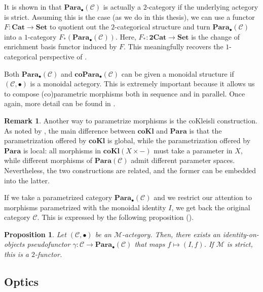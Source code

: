 \documentclass[11pt,a4paper,openright,twoside]{report}
\newcounter{mycounter}
\theoremstyle{plain}
\newtheorem{proposition}[mycounter]{Proposition}
\theoremstyle{definition}
\newtheorem{remark}[mycounter]{Remark}
\begin{document}
It is shown in \cite{gavranovic2024fundamental} that $\mathbf{Para}_{\bullet}(\mathcal{C})$ is actually a $2$-category if the underlying actegory is strict. Assuming this is the case (as we do in this thesis), we can use a functor $F: \mathbf{Cat} \to \mathbf{Set}$ to quotient out the $2$-categorical structure and turn $\mathbf{Para}_{\bullet}(\mathcal{C})$ into a $1$-category $F_{*}(\mathbf{Para}_{\bullet}(\mathcal{C}))$. Here, $F_{*}: \mathbf{2Cat} \to \mathbf{Set}$ is the change of enrichment basis functor induced by $F$. This meaningfully recovers the $1$-categorical perspective of \cite{fong2019backprop}.

Both $\mathbf{Para}_{\bullet}(\mathcal{C})$ and $\mathbf{coPara}_{\bullet}(\mathcal{C})$ can be given a monoidal structure if $(\mathcal{C}, \bullet)$ is a monoidal actegory. This is extremely important because it allows us to compose (co)parametric morphisms both in sequence and in parallel. Once again, more detail can be found in \cite{gavranovic2024fundamental}.

\begin{remark}
  Another way to parametrize morphisms is the coKleisli construction. As noted by \cite{gavranovic2024fundamental}, the main difference between $\mathbf{coKl}$ and $\mathbf{Para}$ is that the parametrization offered by $\mathbf{coKl}$ is global, while the parametrization offered by $\mathbf{Para}$ is local: all morphisms in $\mathbf{coKl}(X \times -)$ must take a parameter in $X$, while different morphisms of $\mathbf{Para}(\mathcal{C})$ admit different parameter spaces. Nevertheless, the two constructions are related, and the former can be embedded into the latter.
\end{remark}

If we take a parametrized category $\mathbf{Para}_\bullet(\mathcal{C})$ and we restrict our attention to morphisms parametrized with the monoidal identity $I$, we get back the original category $\mathcal{C}$. This is expressed by the following proposition (\cite{gavranovic2024fundamental}).

\begin{proposition}
  \label{prop: embeddingth}
  Let $(\mathcal{C}, \bullet)$ be an $\mathcal{M}$-actegory. Then, there exists an identity-on-objects pseudofunctor $\gamma: \mathcal{C} \to \mathbf{Para}_\bullet(\mathcal{C})$ that maps $f \mapsto (I,f)$. If $\mathcal{M}$ is strict, this is a $2$-functor.
\end{proposition}

\subsection{Optics}
\end{document}
